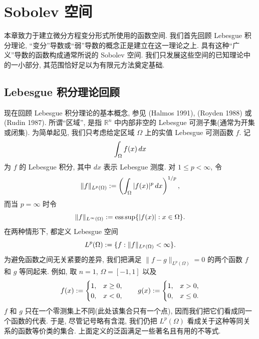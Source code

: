 \clearpage
{}
\section{Sobolev 空间}
\label{chap:ch01-sobolev-spaces}

本章致力于建立微分方程变分形式所使用的函数空间. 我们首先回顾 Lebesgue 积分理论, ``变分''导数或``弱''导数的概念正是建立在这一理论之上. 具有这种``广义''导数的函数构成通常所说的 Sobolev 空间. 我们只发展这些空间的已知理论中的一小部分, 其范围恰好足以为有限元方法奠定基础.

\subsection{Lebesgue 积分理论回顾}
\label{sec:ch01-lebesgue-review}

现在回顾 Lebesgue 积分理论的基本概念, 参见 (Halmos 1991), (Royden 1988) 或 (Rudin 1987). 所谓``区域'', 是指 $\mathbb R^n$ 中内部非空的 Lebesgue 可测子集(通常为开集或闭集). 为简单起见, 我们只考虑给定区域 $\Omega$ 上的实值 Lebesgue 可测函数 $f$. 记
\[
\MathBookFormulaID{formula-ch01-lebesgue-integral}
\int_\Omega f(x)\,dx
\]
为 $f$ 的 Lebesgue 积分, 其中 $dx$ 表示 Lebesgue 测度. 对 $1\leq p<\infty$, 令
\[
\MathBookFormulaID{formula-ch01-lp-norm}
\|f\|_{L^p(\Omega)}:=\left(\int_\Omega|f(x)|^p\,dx\right)^{1/p},
\]
而当 $p=\infty$ 时令
\[
\MathBookFormulaID{formula-ch01-linfty-norm}
\|f\|_{L^\infty(\Omega)}:=\mathop{\mathrm{ess\,sup}}\{|f(x)|:x\in\Omega\}.
\]
在两种情形下, 都定义 Lebesgue 空间
\setcounter{equation}{0}
\begin{equation}
\MathBookFormulaID{formula-ch01-lebesgue-space}
L^p(\Omega):=\{f:\|f\|_{L^p(\Omega)}<\infty\}.
\label{eq:ch01-lebesgue-space}
\end{equation}
为避免函数之间无关紧要的差异, 我们把满足 $\|f-g\|_{L^p(\Omega)}=0$ 的两个函数 $f$ 和 $g$ 等同起来. 例如, 取 $n=1$, $\Omega=[-1,1]$ 以及
\begin{equation}
\MathBookFormulaID{formula-ch01-ae-equivalent-step-functions}
f(x):=\begin{cases}1,&x\geq0,\\0,&x<0,\end{cases}
\qquad
g(x):=\begin{cases}1,&x>0,\\0,&x\leq0.
\end{cases}
\label{eq:ch01-ae-equivalent-step-functions}
\end{equation}
$f$ 和 $g$ 只在一个零测集上不同(此处该集合只有一个点), 因而我们把它们看成同一个函数的代表. 于是, 尽管记号略有含混, 我们仍把 $L^p(\Omega)$ 看成关于这种等同关系的函数等价类的集合. 上面定义的泛函满足一些著名且有用的不等式.


